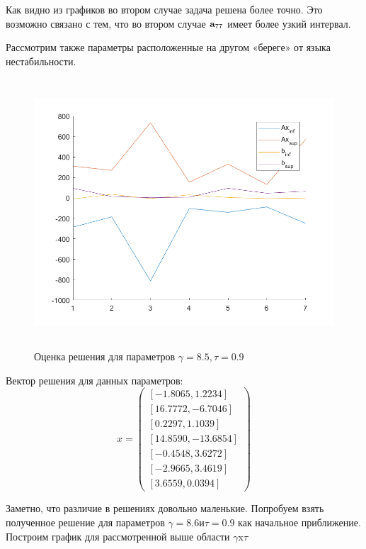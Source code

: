 \documentclass[12pt,a4paper]{scrartcl}
\begin{document}
Как видно из графиков во втором случае задача решена более точно. Это возможно связано с тем, что во втором случае $\bold{a}_{77}$  имеет более узкий интервал. 

Рассмотрим также параметры расположенные на другом «береге» от языка нестабильности.

\begin{figure}[H]
    \centering
    \includegraphics[width=14cm, height=10cm]{fig/g8_5.png}
	\caption{Оценка решения для параметров $\gamma = 8.5, \tau=0.9$}
\end{figure}

Вектор решения для данных параметров: \begin{equation}
x = \begin{pmatrix}
[-1.8065, 1.2234] \\
[16.7772, -6.7046] \\
[0.2297, 1.1039] \\
[14.8590, -13.6854] \\
[-0.4548, 3.6272] \\
[-2.9665, 3.4619] \\
[3.6559, 0.0394]
\end{pmatrix}
\end{equation}

Заметно, что различие в решениях довольно маленькие.
Попробуем взять полученное решение для параметров $\gamma = 8.6 и \tau = 0.9$ как начальное приближение. Построим график для рассмотренной выше области $\gamma$x$\tau$
\end{document}
